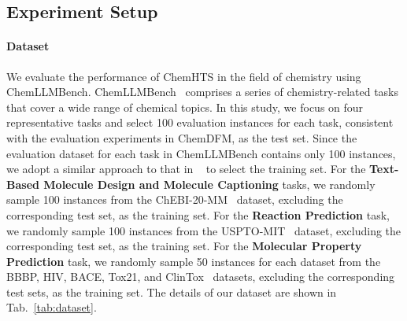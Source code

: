 
\subsection{Experiment Setup}

\paragraph{Dataset}


We evaluate the performance of ChemHTS in the field of chemistry using ChemLLMBench. ChemLLMBench~\cite{guo2023largelanguagemodelschemistry} comprises a series of chemistry-related tasks that cover a wide range of chemical topics. 
In this study, we focus on four representative tasks and select 100 evaluation instances for each task, consistent with the evaluation experiments in ChemDFM, as the test set.
Since the evaluation dataset for each task in ChemLLMBench contains only 100 instances, we adopt a similar approach to that in ~\cite{guo2023largelanguagemodelschemistry} to select the training set. 
For the \textbf{Text-Based Molecule Design and Molecule Captioning} tasks, we randomly sample 100 instances from the ChEBI-20-MM~\cite{liu2025quantitativeanalysisknowledgelearningpreferences}
dataset, excluding the corresponding test set, as the training set. 
For the \textbf{Reaction Prediction} task, we randomly sample 100 instances from the USPTO-MIT~\cite{jin2017predictingorganicreactionoutcomes} dataset, excluding the corresponding test set, as the training set. 
For the \textbf{Molecular Property Prediction} task, we randomly sample 50 instances for each dataset from the BBBP, HIV, BACE, Tox21, and ClinTox~\cite{wu2018moleculenetbenchmarkmolecularmachine} datasets, excluding the corresponding test sets, as the training set.
The details of our dataset are shown in Tab.~\ref{tab:dataset}.


